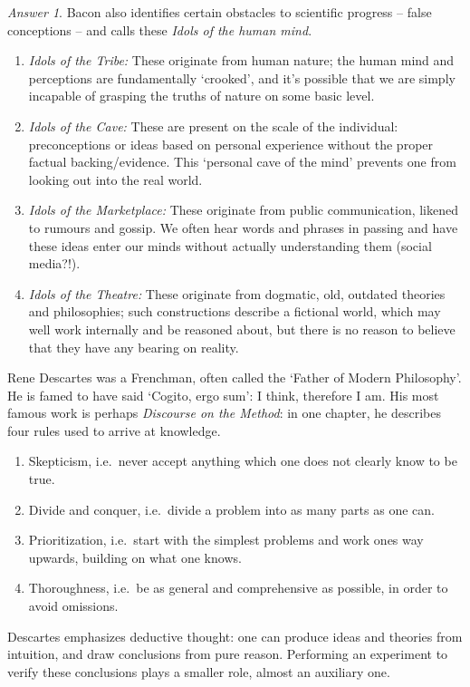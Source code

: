 \documentclass[11pt]{article}
\theoremstyle{remark}
\newtheorem*{answer}{Answer}
\begin{document}
\begin{answer}
        Bacon also identifies certain obstacles to scientific progress -- false
        conceptions -- and calls these \emph{Idols of the human mind}.
        \begin{enumerate}
            \item \textit{Idols of the Tribe:} These originate from human nature; the
            human mind and perceptions are fundamentally `crooked', and it's possible
            that we are simply incapable of grasping the truths of nature on some
            basic level.

            \item \textit{Idols of the Cave:} These are present on the scale of the
            individual: preconceptions or ideas based on personal experience without
            the proper factual backing/evidence. This `personal cave of the mind'
            prevents one from looking out into the real world.

            \item \textit{Idols of the Marketplace:} These originate from public
            communication, likened to rumours and gossip. We often hear words and
            phrases in passing and have these ideas enter our minds without actually
            understanding them (social media?!).

            \item \textit{Idols of the Theatre:} These originate from dogmatic, old,
            outdated theories and philosophies; such constructions describe a
            fictional world, which may well work internally and be reasoned about,
            but there is no reason to believe that they have any bearing on reality.
        \end{enumerate}
    \end{answer}


    Rene Descartes was a Frenchman, often called the `Father of Modern Philosophy'.
    He is famed to have said `Cogito, ergo sum': I think, therefore I am. His most
    famous work is perhaps \emph{Discourse on the Method}: in one chapter, he
    describes four rules used to arrive at knowledge.
    \begin{enumerate}
        \itemsep0em
        \item Skepticism, i.e.\ never accept anything which one does not clearly know
        to be true.
        \item Divide and conquer, i.e.\ divide a problem into as many parts as one can.
        \item Prioritization, i.e.\ start with the simplest problems and work ones
        way upwards, building on what one knows.
        \item Thoroughness, i.e.\ be as general and comprehensive as possible, in
        order to avoid omissions.
    \end{enumerate}
    Descartes emphasizes deductive thought: one can produce ideas and theories from
    intuition, and draw conclusions from pure reason. Performing an experiment to
    verify these conclusions plays a smaller role, almost an auxiliary one. 
\end{document}
